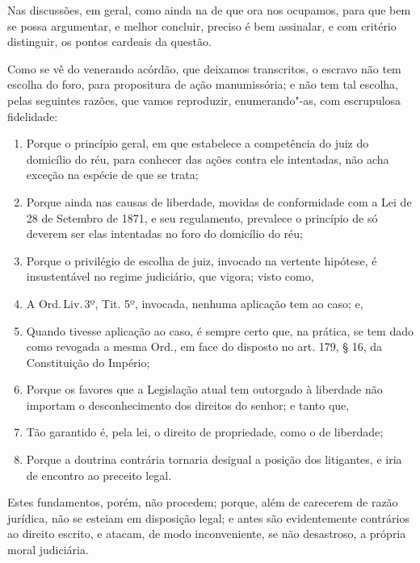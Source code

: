 Nas discussões, em geral, como ainda na de que ora nos ocupamos, para
que bem se possa argumentar, e melhor concluir, preciso é bem assinalar,
e com critério distinguir, os pontos cardeais da questão.

Como se vê do venerando acórdão, que deixamos transcritos, o escravo não
tem escolha do foro, para propositura de ação manumissória; e não tem
tal escolha, pelas seguintes razões, que vamos reproduzir,
enumerando"-as, com escrupulosa fidelidade:

\begin{enumerate}[label=\arabic*º]
\item Porque o princípio geral, em que estabelece a competência do juiz do
domicílio do réu, para conhecer das ações contra ele intentadas, não
acha exceção na espécie de que se trata;

\item Porque ainda nas causas de liberdade, movidas de conformidade com a
Lei de 28 de Setembro de 1871, e seu regulamento, prevalece o princípio
de só deverem ser elas intentadas no foro do domicílio do réu;

\item Porque o privilégio de escolha de juiz, invocado na vertente
hipótese, é insustentável no regime judiciário, que vigora; visto como,

\item A Ord.\,Liv.\,3º, Tit. 5º, invocada, nenhuma aplicação tem ao caso; e,

\item Quando tivesse aplicação ao caso, é sempre certo que, na prática, se
tem dado como revogada a mesma Ord., em face do disposto no art. 179, §
16, da Constituição do Império;

\item Porque os favores que a Legislação atual tem outorgado à liberdade
não importam o desconhecimento dos direitos do senhor; e tanto que,

\item Tão garantido é, pela lei, o direito de propriedade, como o de
liberdade;

\item Porque a doutrina contrária tornaria desigual a posição dos
litigantes, e iria de encontro ao preceito legal.
\end{enumerate}

Estes fundamentos, porém, não procedem; porque, além de carecerem de
razão jurídica, não se esteiam em disposição legal; e antes são
evidentemente contrários ao direito escrito, e atacam, de modo
inconveniente, se não desastroso, a própria moral judiciária.

